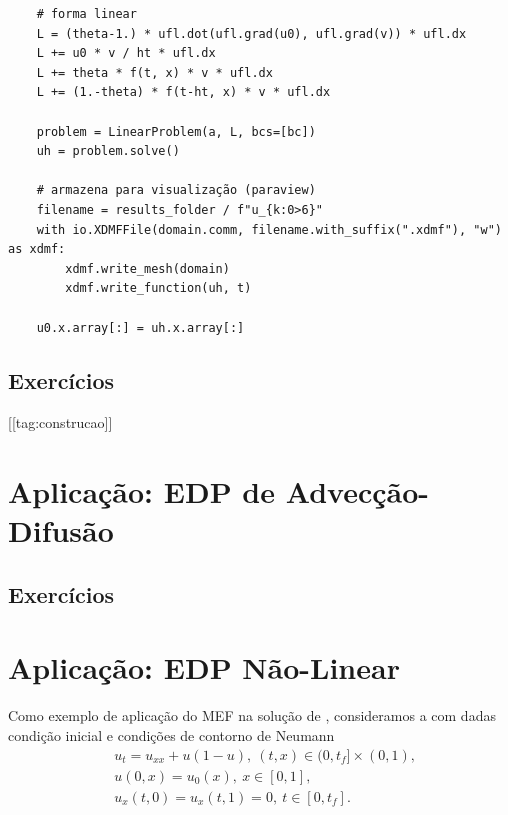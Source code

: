 \begin{ex}
\begin{lstlisting}
    # forma linear
    L = (theta-1.) * ufl.dot(ufl.grad(u0), ufl.grad(v)) * ufl.dx
    L += u0 * v / ht * ufl.dx
    L += theta * f(t, x) * v * ufl.dx
    L += (1.-theta) * f(t-ht, x) * v * ufl.dx

    problem = LinearProblem(a, L, bcs=[bc])
    uh = problem.solve()

    # armazena para visualização (paraview)
    filename = results_folder / f"u_{k:0>6}"
    with io.XDMFFile(domain.comm, filename.with_suffix(".xdmf"), "w") as xdmf:
        xdmf.write_mesh(domain)
        xdmf.write_function(uh, t)

    u0.x.array[:] = uh.x.array[:]  
\end{lstlisting}
\end{ex}


\subsection{Exercícios}
[[tag:construcao]]

\section{Aplicação: EDP de Advecção-Difusão}\label{cap_mef1d_sec_eqad}

\subsection{Exercícios}


\section{Aplicação: EDP Não-Linear}\label{cap_mef1d_sec_eqnl}

Como exemplo de aplicação do MEF na solução de , consideramos a  com dadas condição inicial e condições de contorno de Neumann{\neumann}
\begin{subequations}\label{cap_mef1d_sec_eqnl:eq:prob}
  \begin{align}
    &u_t = u_{xx} + u(1-u), ~(t,x)\in (0,t_f]\times (0,1),\\
    &u(0, x) = u_0(x), ~x\in [0,1],\\
    &u_x(t,0) = u_x(t,1) = 0, ~t\in [0,t_f].
  \end{align}
\end{subequations}

